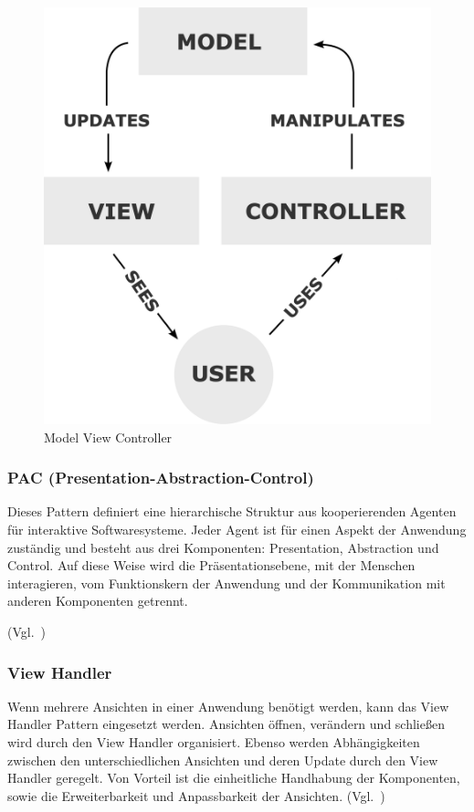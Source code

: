 \begin{figure}[h!]
    \centering
    \caption{Model View Controller}
    \label{fig:mvc}
    \includegraphics[scale=0.20]{assets/wikipedia_mvc_process}
\end{figure}

\subsubsection{PAC (Presentation-Abstraction-Control)}
Dieses Pattern definiert eine hierarchische Struktur aus kooperierenden Agenten für interaktive Softwaresysteme.
Jeder Agent ist für einen Aspekt der Anwendung zuständig und besteht aus drei Komponenten: Presentation, Abstraction und Control.
Auf diese Weise wird die Präsentationsebene, mit der Menschen interagieren, vom Funktionskern der Anwendung und der Kommunikation mit anderen Komponenten getrennt.

(Vgl.~\cite{buschmann-pattern-oriented-software-architecture})

\subsubsection{View Handler}
Wenn mehrere Ansichten in einer Anwendung benötigt werden, kann das View Handler Pattern eingesetzt werden.
Ansichten öffnen, verändern und schließen wird durch den View Handler organisiert.
Ebenso werden Abhängigkeiten zwischen den unterschiedlichen Ansichten und deren Update durch den View Handler geregelt.
Von Vorteil ist die einheitliche Handhabung der Komponenten, sowie die Erweiterbarkeit und Anpassbarkeit der Ansichten.
(Vgl.~\cite{buschmann-pattern-oriented-software-architecture})


